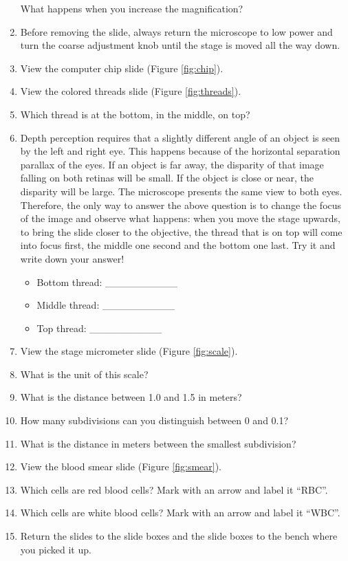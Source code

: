 \documentclass[]{book}
\providecommand{\tightlist}{%
  \setlength{\itemsep}{0pt}\setlength{\parskip}{0pt}}
\theoremstyle{definition}
\theoremstyle{definition}
\theoremstyle{definition}
\theoremstyle{remark}
\begin{document}
\begin{enumerate}
  What happens when you increase the magnification?
\item
  Before removing the slide, always return the microscope to low power
  and turn the coarse adjustment knob until the stage is moved all the
  way down.
\item
  View the computer chip slide (Figure \ref{fig:chip}).
\item
  View the colored threads slide (Figure \ref{fig:threads}).
\item
  Which thread is at the bottom, in the middle, on top?
\item
  Depth perception requires that a slightly different angle of an object
  is seen by the left and right eye. This happens because of the
  horizontal separation parallax of the eyes. If an object is far away,
  the disparity of that image falling on both retinas will be small. If
  the object is close or near, the disparity will be large. The
  microscope presents the same view to both eyes. Therefore, the only
  way to answer the above question is to change the focus of the image
  and observe what happens: when you move the stage upwards, to bring
  the slide closer to the objective, the thread that is on top will come
  into focus first, the middle one second and the bottom one last. Try
  it and write down your answer!

  \begin{itemize}
  \tightlist
  \item
    Bottom thread: \_\_\_\_\_\_\_\_\_\_
  \item
    Middle thread: \_\_\_\_\_\_\_\_\_\_
  \item
    Top thread: \_\_\_\_\_\_\_\_\_\_
  \end{itemize}
\item
  View the stage micrometer slide (Figure \ref{fig:scale}).
\item
  What is the unit of this scale?
\item
  What is the distance between 1.0 and 1.5 in meters?
\item
  How many subdivisions can you distinguish between 0 and 0.1?
\item
  What is the distance in meters between the smallest subdivision?
\item
  View the blood smear slide (Figure \ref{fig:smear}).
\item
  Which cells are red blood cells? Mark with an arrow and label it
  ``RBC''.
\item
  Which cells are white blood cells? Mark with an arrow and label it
  ``WBC''.
\item
  Return the slides to the slide boxes and the slide boxes to the bench
  where you picked it up.
\end{enumerate}
\end{document}
